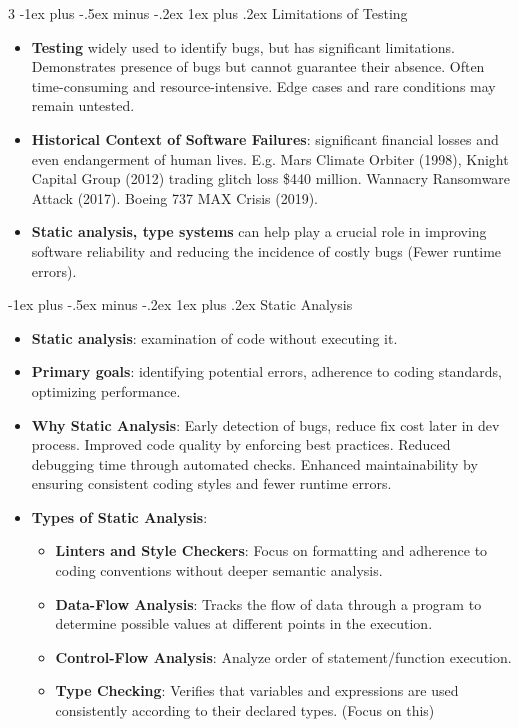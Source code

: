 \documentclass[a4paper, 10pt, landscape]{article}
\makeatletter
\renewcommand{\subsubsection}{\@startsection{subsubsection}{3}{0mm}%
                                {-1ex plus -.5ex minus -.2ex}%
                                {1ex plus .2ex}%
                                {\normalfont\small\bfseries}}
\makeatother
\begin{document}
\begin{multicols*}{3}
\subsubsection{Limitations of Testing}
\begin{itemize}
\item \textbf{Testing} widely used to identify bugs, but has significant limitations. Demonstrates presence of bugs but cannot guarantee their absence. Often time-consuming and resource-intensive. Edge cases and rare conditions may remain untested.
\item \textbf{Historical Context of Software Failures}: significant financial losses and even endangerment of human lives. E.g. Mars Climate Orbiter (1998), Knight Capital Group (2012) trading glitch loss \$440 million. Wannacry Ransomware Attack (2017). Boeing 737 MAX Crisis (2019).
\item \textbf{Static analysis, type systems} can help play a crucial role in improving software reliability and reducing the incidence of costly bugs (Fewer runtime errors).
\end{itemize}

\subsubsection{Static Analysis}
\begin{itemize}
\item \textbf{Static analysis}: examination of code without executing it. 
\item \textbf{Primary goals}: identifying potential errors, adherence to coding standards, optimizing performance.
\item \textbf{Why Static Analysis}: Early detection of bugs, reduce fix cost later in dev process. Improved code quality by enforcing best practices.
	Reduced debugging time through automated checks. Enhanced maintainability by ensuring consistent coding styles and fewer runtime errors.
\item \textbf{Types of Static Analysis}:
	\begin{itemize}
	\item \textbf{Linters and Style Checkers}: Focus on formatting and adherence to coding conventions without deeper semantic analysis.
	\item \textbf{Data-Flow Analysis}: Tracks the flow of data through a program to determine possible values at different points in the execution.
	\item \textbf{Control-Flow Analysis}: Analyze order of statement/function execution.
	\item \textbf{Type Checking}: Verifies that variables and expressions are used consistently according to their declared types. (Focus on this)
	\end{itemize}
\end{itemize}


\end{multicols*}
\end{document}
